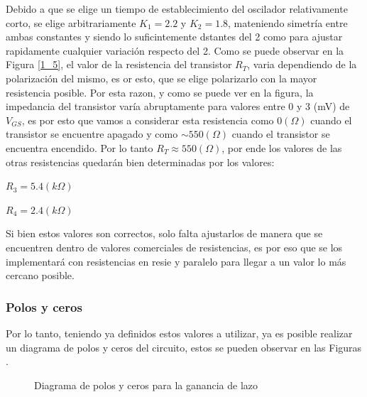 Debido a que se elige un tiempo de establecimiento del oscilador relativamente
corto, se elige arbitrariamente $K_{1}=2.2$ y $K_{2}=1.8$, mateniendo
simetría entre ambas constantes y siendo lo suficintemente dstantes
del 2 como para ajustar rapidamente cualquier variación respecto del
2. Como se puede observar en la Figura \ref{1_5}, el valor de la
resistencia del transistor $R_{T}$, varia dependiendo de la polarización
del mismo, es or esto, que se elige polarizarlo con la mayor resistencia
posible. Por esta razon, y como se puede ver en la figura, la impedancia
del transistor varía abruptamente para valores entre 0 y 3 (mV) de
$V_{GS}$, es por esto que vamos a considerar esta resistencia como
$0(\Omega)$ cuando el transistor se encuentre apagado y como $\sim550(\Omega)$
cuando el transistor se encuentra encendido. Por lo tanto $R_{T}\approx550(\Omega)$,
por ende los valores de las otras resistencias quedarán bien determinadas
por los valores:

$R_{3}=5.4(k\Omega)$

$R_{4}=2.4(k\Omega)$

Si bien estos valores son correctos, solo falta ajustarlos de manera
que se encuentren dentro de valores comerciales de resistencias, es
por eso que se los implementará con resistencias en resie y paralelo
para llegar a un valor lo más cercano posible.

\subsubsection{Polos y ceros}

Por lo tanto, teniendo ya definidos estos valores a utilizar, ya es
posible realizar un diagrama de polos y ceros del circuito, estos
se pueden observar en las Figuras .
\begin{center}
\begin{figure}[h]
\begin{centering}
\par\end{centering}
\begin{centering}
\caption{Diagrama de polos y ceros para la ganancia de lazo}
\par\end{centering}
\end{figure}
\par\end{center}

